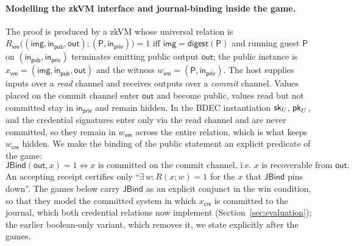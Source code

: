 \paragraph{Modelling the zkVM interface and journal-binding inside the game.}
The proof is produced by a zkVM whose universal relation is $R_{\mathsf{vm}}\bigl((\mathsf{img},\mathsf{in}_{\mathsf{pub}},\mathsf{out});(\mathsf{P},\mathsf{in}_{\mathsf{priv}})\bigr)=1$ iff $\mathsf{img}=\mathsf{digest}(\mathsf{P})$ and running guest $\mathsf{P}$ on $(\mathsf{in}_{\mathsf{pub}},\mathsf{in}_{\mathsf{priv}})$ terminates emitting public output $\mathsf{out}$; the public instance is $x_{\mathsf{vm}}=(\mathsf{img},\mathsf{in}_{\mathsf{pub}},\mathsf{out})$ and the witness $w_{\mathsf{vm}}=(\mathsf{P},\mathsf{in}_{\mathsf{priv}})$. The host supplies inputs over a \emph{read} channel and receives outputs over a \emph{commit} channel. Values placed on the commit channel enter $\mathsf{out}$ and become public, values read but not committed stay in $\mathsf{in}_{\mathsf{priv}}$ and remain hidden. In the BDEC instantiation $\mathsf{sk}_U$, $\mathsf{pk}_U$, and the credential signatures enter only via the read channel and are never committed, so they remain in $w_{\mathsf{vm}}$ across the entire relation, which is what keeps $w_{\mathsf{cre}}$ hidden. We make the binding of the public statement an explicit predicate of the game:
\begin{equation*}
  \mathsf{JBind}(\mathsf{out},x)=1
  \iff
  \text{$x$ is committed on the commit channel, i.e.\ $x$ is recoverable from $\mathsf{out}$.}
\end{equation*}
An accepting receipt certifies only ``$\exists\,w:R(x;w)=1$ for the $x$ that $\mathsf{JBind}$ pins down''. The games below carry $\mathsf{JBind}$ as an explicit conjunct in the win condition, so that they model the committed system in which $x_{\mathsf{cre}}$ is committed to the journal, which both credential relations now implement (Section~\ref{sec:evaluation}); the earlier boolean-only variant, which removes it, we state explicitly after the games.


